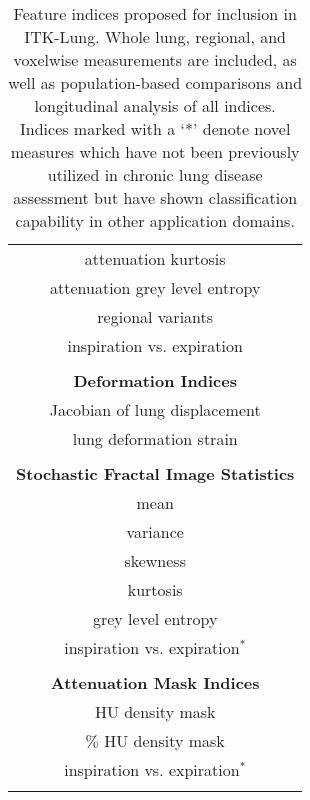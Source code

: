 \begin{table}[!t]
\begin{minipage}{0.33 \linewidth}
\begin{tabular}[t]{c}
    attenuation kurtosis  \\
    attenuation grey level entropy  \\
    regional variants  \\
    inspiration vs. expiration \\
    \\
    {\bf Deformation Indices}  {} \\
    \cmidrule[1pt](lr){1-1}
    Jacobian of lung displacement  \\
    lung deformation strain  \\
    \\
    {\bf Stochastic Fractal Image Statistics}\\
    \cmidrule[1pt](lr){1-1}
    mean  \\
    variance  \\
    skewness  \\
    kurtosis  \\
    grey level entropy  \\
    inspiration vs. expiration$^*$  \\
    \\
    {\bf Attenuation Mask Indices} \\
    \cmidrule[1pt](lr){1-1}
    HU density mask   \\
    $\%$ HU density mask  \\
    inspiration vs. expiration$^*$ \\
    \\
    \end{tabular}
   \end{minipage}
 \label{table:indices}
 \caption{Feature indices proposed for inclusion in ITK-Lung.  Whole lung, regional, and voxelwise measurements are included, as well as population-based comparisons and longitudinal analysis of all indices.  Indices marked with a `*' denote novel measures which have not been previously utilized in chronic lung disease assessment but have shown classification capability in other application domains.}
\end{table}
